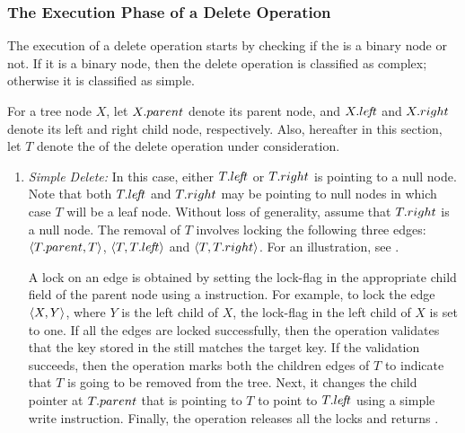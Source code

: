 \subsubsection{The Execution Phase of a Delete Operation}
The execution of a delete operation starts by checking if the \targetnode{} is a binary node or not. If it is a binary node, then the delete operation is classified as complex; otherwise it is classified as simple. 

For a tree node $X$, let $X.parent$ denote its parent node, and $X.le\!f\!t$ and $X.right$ denote its left and right child node, respectively. Also, hereafter in this section, let $T$ denote the \targetnode{} of the delete operation under consideration.
\begin{enumerate}[label=(\alph*)]
\item \emph{Simple Delete:}
In this case, either $T.le\!f\!t$ or $T.right$ is pointing to a null node. Note that both $T.le\!f\!t$ and $T.right$ may be pointing to null nodes in which case $T$ will be a leaf node. Without loss of generality, assume that $T.right$ is a null node. The removal of $T$ involves locking the following three edges: $\langle {T.parent}, {T} \rangle$, $\langle {T}, {T.le\!f\!t} \rangle$ and $\langle {T}, {T.right} \rangle$. For an illustration, see .


A lock on an edge is obtained by setting the lock-flag in the appropriate child field of the parent node using a \CAS{} instruction. For example, to lock the edge $\langle {X}, {Y} \rangle$, where $Y$ is the left child of $X$, the lock-flag in the left child of $X$ is set to one. If all the edges are locked successfully, then the operation validates that the key stored in the \targetnode{} still matches the target key. If the validation succeeds, then the operation marks both the children edges of $T$  to indicate that $T$ is going to be removed from the tree. Next, it changes the child pointer at $T.parent$ that is pointing to $T$ to point to $T.le\!f\!t$ using a simple write instruction. Finally, the operation releases all the locks and returns \true{}. 


\end{enumerate}
